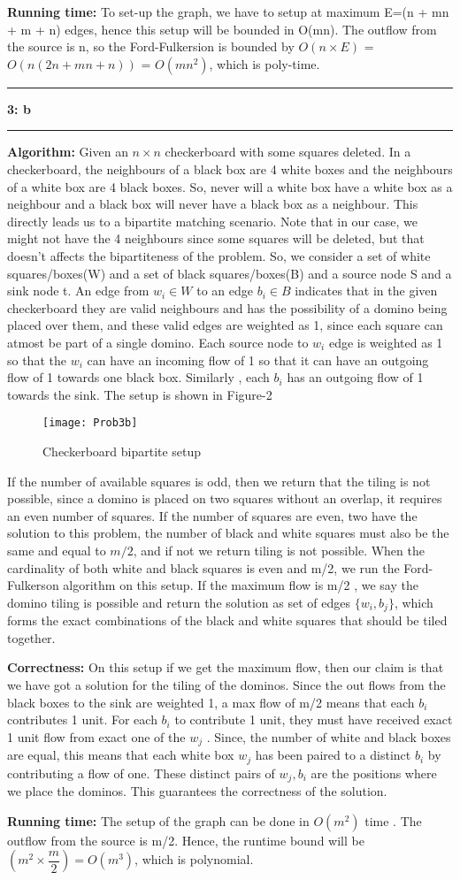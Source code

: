 \documentclass{article}
\newcommand\question[2]{\vspace{.25in}\hrule\textbf{#1: #2}\hrule\vspace{.10in}}
\newcommand\algo{\vspace{.10in}\textbf{Algorithm: }}
\newcommand\correctness{\vspace{.10in}\textbf{Correctness: }}
\newcommand\runtime{\vspace{.10in}\textbf{Running time: }}
\begin{document}
  \runtime  To set-up the graph, we have to setup at maximum E=(n + mn + m + n) edges, hence this setup will be bounded in O(mn). The outflow from the source is n, so the Ford-Fulkersion is bounded by $O(n \times E)$ = $O(n(2n+mn+n))$ = $O(mn^2)$, which is poly-time.


  \question{3}{b}
  \algo Given an $n \times n$ checkerboard with some squares deleted. In a checkerboard, the neighbours of a black box are 4 white boxes and the neighbours of a white box are 4 black boxes. So, never will a white box have a white box as a neighbour and a black box will never have a black box as a neighbour. This directly leads us to a bipartite matching scenario. Note that in our case, we might not have the 4 neighbours since some squares will be deleted, but that doesn't affects the bipartiteness of the problem. So, we consider a set of white squares/boxes(W) and a set of black squares/boxes(B) and a source node S and a sink node t. An edge from $w_i \in W$ to an edge $b_i \in B$ indicates that in the given checkerboard they are valid neighbours and has the possibility of a domino being placed over them, and these valid edges are weighted as 1, since each square can atmost be part of a single domino. Each source node to $w_i$ edge is weighted as 1 so that the $w_i$ can have an incoming flow of 1 so that it can have an outgoing flow of 1 towards one black box. Similarly , each $b_i$ has an outgoing flow of 1 towards the sink. The setup is shown in Figure-2
  \begin{figure}[H]
   \centering
  \texttt{[image: Prob3b]}
  \caption{Checkerboard bipartite setup}
  \end{figure}

  If the number of available squares is odd, then we return that the tiling is not possible, since a domino is placed on two squares without an overlap, it requires an even number of squares. If the number of squares are even, two have the solution to this problem, the number of black and white squares must also be the same and equal to $m/2$, and if not we return tiling is not possible. When the cardinality of both white and black squares is even and m/2, we run the Ford-Fulkerson algorithm on this setup. If the maximum flow is m/2 , we say the domino tiling is possible and return the solution as set of edges $\{w_i,b_j\}$, which forms the exact combinations of the black and white squares that should be tiled together. \newline

  \correctness On this setup if we get the maximum flow, then our claim is that we have got a solution for the tiling of the dominos. Since the out flows from the black boxes to the sink are weighted 1, a max flow of m/2 means that each $b_i$ contributes 1 unit. For each $b_i$ to contribute 1 unit, they must have received exact 1 unit flow from exact one of the $w_j$ . Since, the number of white and black boxes are equal, this means that each white box $w_{j}$ has been paired to a distinct $b_i$ by contributing a flow of one. These distinct pairs of $w_j,b_i$ are the positions where we place the dominos. This guarantees the correctness of the solution. \newline

  \runtime The setup of the graph can be done in $O(m^2)$ time . The outflow from the source is m/2. Hence, the runtime bound will be $(m^2 \times \dfrac{m}{2}) = O(m^3)$, which is polynomial. 
   
 
\end{document}
